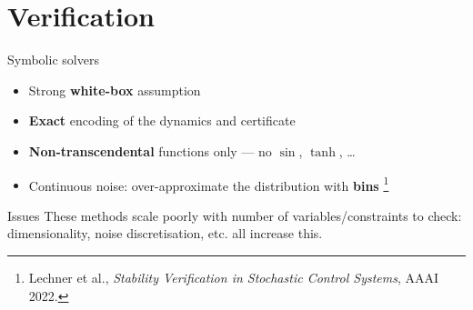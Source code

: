 \documentclass{beamer}
\begin{document}


\section{Verification}


\begin{frame}{Symbolic solvers}
  \begin{itemize}
    \item Strong \textbf{white-box} assumption
    \item \textbf{Exact} encoding of the dynamics and certificate
    \item \textbf{Non-transcendental} functions only --- no $\sin$, $\tanh$, \ldots
    \item Continuous noise: over-approximate the distribution with \textbf{bins}%
      \footnote{\scriptsize Lechner et al., \emph{Stability Verification in Stochastic Control Systems}, AAAI 2022.}
  \end{itemize}

  \alert{Issues}
  These methods scale poorly with number of variables/constraints to check: dimensionality, noise discretisation, etc. all increase this.
\end{frame}
\end{document}
